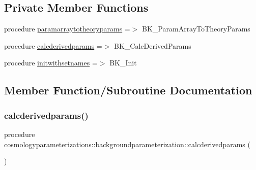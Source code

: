 \subsection*{Private Member Functions}
\begin{DoxyCompactItemize}
\item 
procedure \mbox{\hyperlink{structcosmologyparameterizations_1_1backgroundparameterization_a0c40db7122e98fdeba557e49ebf16625}{paramarraytotheoryparams}} =$>$ B\+K\+\_\+\+Param\+Array\+To\+Theory\+Params
\item 
procedure \mbox{\hyperlink{structcosmologyparameterizations_1_1backgroundparameterization_a9441919e6fd9dcd9e4c3ce2abc862076}{calcderivedparams}} =$>$ B\+K\+\_\+\+Calc\+Derived\+Params
\item 
procedure \mbox{\hyperlink{structcosmologyparameterizations_1_1backgroundparameterization_aba4ea959426ad2350638acae78b48e8f}{initwithsetnames}} =$>$ B\+K\+\_\+\+Init
\end{DoxyCompactItemize}


\subsection{Member Function/\+Subroutine Documentation}
\mbox{\label{structcosmologyparameterizations_1_1backgroundparameterization_a9441919e6fd9dcd9e4c3ce2abc862076}} 
\subsubsection{\texorpdfstring{calcderivedparams()}{calcderivedparams()}}
{\footnotesize\ttfamily procedure cosmologyparameterizations\+::backgroundparameterization\+::calcderivedparams (\begin{DoxyParamCaption}{ }\end{DoxyParamCaption})\hspace{0.3cm}{\ttfamily [private]}}

\mbox{\label{structcosmologyparameterizations_1_1backgroundparameterization_aba4ea959426ad2350638acae78b48e8f}} 
